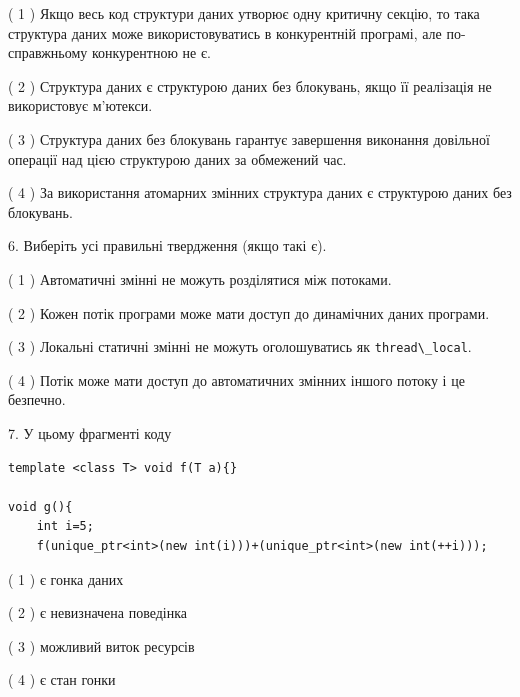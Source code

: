 \documentclass[12pt, ukrainian]{article}
\def\code#1{\Verb!#1!}
\begin{document}
\begin {large}
{( 1 ) Якщо весь код структури даних утворює одну критичну секцію, то така структура даних може використовуватись в конкурентній програмі, але по-справжньо\-му конкурентною не є.%

( 2 ) Структура даних є структурою даних без блокувань, якщо її реалізація не використовує м’ютекси.%

( 3 ) Структура даних без блокувань гарантує завершення виконання довільної операції над цією структурою даних за обмежений час.%

( 4 ) За використання атомарних змінних структура даних є структурою даних без блокувань.%
\newpage



\vspace{5mm}
6. Виберіть усі правильні твердження (якщо такі є).\par
\vspace{2mm}

( 1 ) Автоматичні змінні не можуть розділятися між потоками.%

( 2 ) Кожен потік програми може мати доступ до динамічних даних програми.%

( 3 ) Локальні статичні змінні не можуть оголошуватись як \code{thread\_local}.%

( 4 ) Потік може мати доступ до автоматичних змінних іншого потоку і це безпечно.%


\vspace{5mm}
7. У цьому фрагменті коду
\begin{verbatim}
template <class T> void f(T a){}

void g(){
    int i=5;
    f(unique_ptr<int>(new int(i)))+(unique_ptr<int>(new int(++i)));
\end{verbatim}
( 1 ) є гонка даних%

( 2 ) є невизначена поведінка%

( 3 ) можливий виток ресурсів%

( 4 ) є стан гонки%
}
\end {large}
\end{document}

